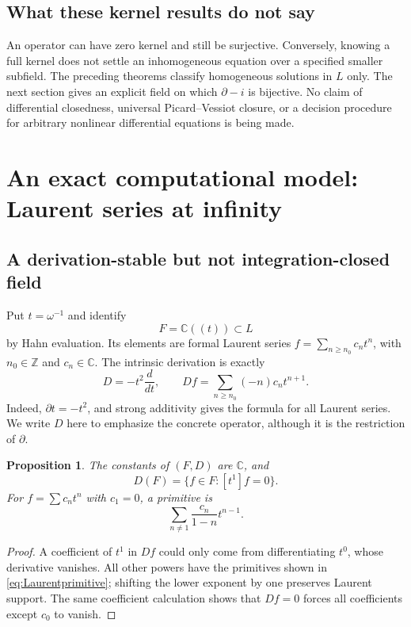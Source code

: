 \documentclass[11pt]{article}
\numberwithin{equation}{section}
\newtheorem{proposition}[theorem]{Proposition}
\theoremstyle{definition}
\newcommand{\C}{\mathbb C}
\newcommand{\Z}{\mathbb Z}
\newcommand{\DD}{\partial}
\begin{document}
\subsection{What these kernel results do not say}
An operator can have zero kernel and still be surjective. Conversely,
knowing a full kernel does not settle an inhomogeneous equation over a
specified smaller subfield. The preceding theorems classify homogeneous
solutions in $L$ only. The next section gives an explicit field on which
$\DD-i$ is bijective. No claim of differential closedness, universal
Picard--Vessiot closure, or a decision procedure for arbitrary nonlinear
differential equations is being made.

\section{An exact computational model: Laurent series at infinity}
\label{sec:laurent}

\subsection{A derivation-stable but not integration-closed field}
Put $t=\omega^{-1}$ and identify
\[
 F=\C((t))\subset L
\]
by Hahn evaluation. Its elements are formal Laurent series
$f=\sum_{n\ge n_0}c_nt^n$, with $n_0\in\Z$ and $c_n\in\C$.
The intrinsic derivation is exactly
\begin{equation}\label{eq:LaurentD}
 D=-t^2\frac{d}{dt},\qquad
 Df=\sum_{n\ge n_0}(-n)c_nt^{n+1}.
\end{equation}
Indeed, $\DD t=-t^2$, and strong additivity gives the formula for all
Laurent series. We write $D$ here to emphasize the concrete operator,
although it is the restriction of $\DD$.

\begin{proposition}\label{prop:Laurentintegration}
The constants of $(F,D)$ are $\C$, and
\begin{equation}\label{eq:Laurentimage}
 D(F)=\{f\in F:[t^1]f=0\}.
\end{equation}
For $f=\sum c_nt^n$ with $c_1=0$, a primitive is
\begin{equation}\label{eq:Laurentprimitive}
 \sum_{n\ne1}\frac{c_n}{1-n}t^{n-1}.
\end{equation}
\end{proposition}
\begin{proof}
A coefficient of $t^1$ in $Df$ could only come from differentiating
$t^0$, whose derivative vanishes. All other powers have the primitives
shown in \eqref{eq:Laurentprimitive}; shifting the lower exponent by one
preserves Laurent support. The same coefficient calculation shows that
$Df=0$ forces all coefficients except $c_0$ to vanish.
\end{proof}
\end{document}
